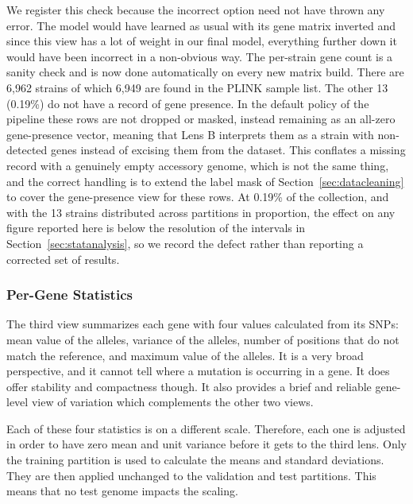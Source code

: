\documentclass[journal]{IEEEtran}
\begin{document}
We register this check because the incorrect option need not have thrown any error.
The model would have learned as usual with its gene matrix inverted and since this
view has a lot of weight in our final model, everything further down it would have
been incorrect in a non-obvious way. The per-strain gene count is a sanity check
and is now done automatically on every new matrix build. There are 6,962 strains of
which 6,949 are found in the PLINK sample list. The other 13 (0.19\%) do not
have a record of gene presence. In the default policy of the pipeline these rows
are not dropped or masked, instead remaining as an all-zero gene-presence vector,
meaning that Lens B interprets them as a strain with non-detected genes instead of
excising them from the dataset. This conflates a missing record with a genuinely
empty accessory genome, which is not the same thing, and the correct handling is to
extend the label mask of Section~\ref{sec:datacleaning} to cover the gene-presence
view for these rows. At 0.19\% of the collection, and with the 13 strains distributed
across partitions in proportion, the effect on any figure reported here is below the
resolution of the intervals in Section~\ref{sec:statanalysis}, so we record the defect
rather than reporting a corrected set of results.

\subsubsection{Per-Gene Statistics}
The third view summarizes each gene with four values calculated from its SNPs: mean
value of the alleles, variance of the alleles, number of positions that do not
match the reference, and maximum value of the alleles. It is a very broad
perspective, and it cannot tell where a mutation is occurring in a gene. It does
offer stability and compactness though. It also provides a brief and reliable
gene-level view of variation which complements the other two views.

Each of these four statistics is on a different scale. Therefore, each one is
adjusted in order to have zero mean and unit variance before it gets to the third
lens. Only the training partition is used to calculate the means and standard
deviations. They are then applied unchanged to the validation and test partitions.
This means that no test genome impacts the scaling.
\end{document}
